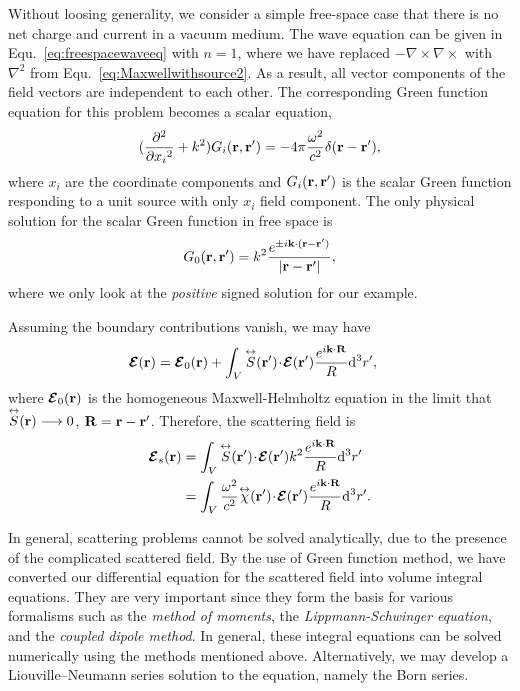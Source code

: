 Without loosing generality, we consider a simple free-space case that there is no net charge and current in a vacuum medium. The wave equation can be given in Equ.~\eqref{eq:freespacewaveeq} with $ n=1 $, where we have replaced $ -\nabla\times\nabla\times $ with $ \nabla^2 $ from Equ.~\eqref{eq:Maxwellwithsource2}. As a result, all vector components of the field vectors are independent to each other. The corresponding Green function equation for this problem becomes a scalar equation,
\begin{align}
(\frac{\partial^2 {}}{\partial {x_i}^2} + k^2) G_i(\mathbf{r},\mathbf{r}')=-4\pi \frac{\omega^2}{c^2}\delta(\mathbf{r}-\mathbf{r}'), 
\end{align}
where $ x_i $ are the coordinate components and $ G_i(\mathbf{r},\mathbf{r}') $ is the scalar Green function responding to a unit source with only $ x_i $ field component. 
The only physical solution for the scalar Green function in free space is 
\begin{align}
G_0(\mathbf{r},\mathbf{r}') =k^2\frac{e^{\pm i\mathbf{k}\cdot (\mathbf{r}-\mathbf{r}')}}{|\mathbf{r}-\mathbf{r}'|},
\end{align}
where we only look at the \textit{positive} signed solution for our example. 

Assuming the boundary contributions vanish, we may have
\begin{align}
\boldsymbol{\mathcal{E}}(\br) &= \boldsymbol{\mathcal{E}}_0 (\br) + \int_V \tensor{S}(\br') \! \cdot\! \boldsymbol{\mathcal{E}}(\br') \frac{e^{i\mathbf{k}\cdot \mathbf{R}}}{R} \mathrm{d}^3 r', \label{Etotal0}
\end{align}
where $ \boldsymbol{\mathcal{E}}_0 (\mathbf{r}) $ is the homogeneous Maxwell-Helmholtz equation in the limit that $ \overset{\leftrightarrow}{S}(\mathbf{r})\longrightarrow 0 $, $ \mathbf{R}=\mathbf{r}-\mathbf{r}' $. Therefore, the scattering field is
\begin{align}
\boldsymbol{\mathcal{E}}_s(\mathbf{r}) &=  \int_V \overset{\leftrightarrow}{S}(\mathbf{r}') \! \cdot\!\boldsymbol{\mathcal{E}}(\mathbf{r}')k^2 \frac{e^{i\mathbf{k}\cdot \mathbf{R}}}{R} \mathrm{d}^3 r'\\
&= \int_V \frac{\omega^2}{c^2} \overset{\leftrightarrow}{\chi}(\mathbf{r}') \! \cdot\!\boldsymbol{\mathcal{E}}(\mathbf{r}') \frac{e^{i\mathbf{k}\cdot \mathbf{R}}}{R} \mathrm{d}^3 r'.
\end{align}



In general, scattering problems cannot be solved analytically, due to the presence of the complicated scattered field. By the use of Green function method, we have converted our differential equation for the scattered field into volume integral equations. They are very important since they form the basis for various formalisms such as the \textit{method of moments}, the \textit{Lippmann-Schwinger equation}, and the \textit{coupled dipole method}. In general, these integral equations can be solved numerically using the methods mentioned above. Alternatively, we may develop a Liouville–Neumann series solution to the equation, namely the Born series.

